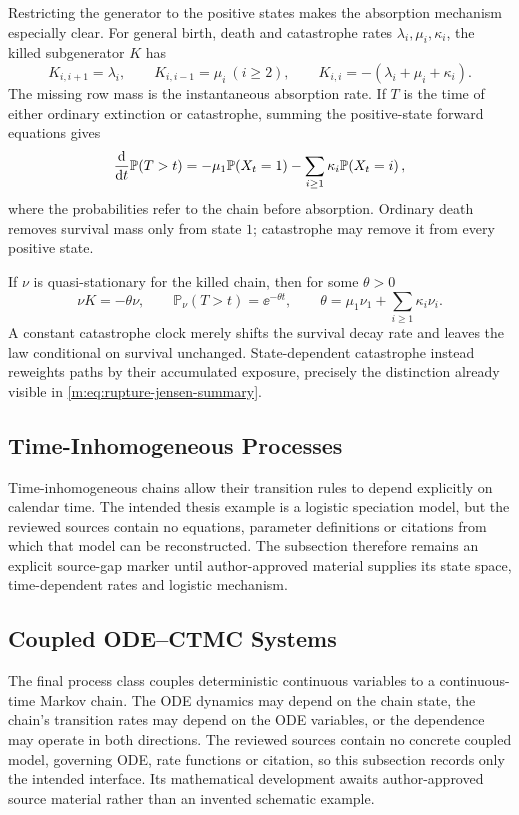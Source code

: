 Restricting the generator to the positive states makes the absorption mechanism
especially clear.  For general birth, death and catastrophe rates
$\lambda_i,\mu_i,\kappa_i$, the killed subgenerator $K$ has
\begin{equation}
  K_{i,i+1}=\lambda_i,\qquad
  K_{i,i-1}=\mu_i\ (i\geq2),\qquad
  K_{i,i}=-(\lambda_i+\mu_i+\kappa_i).
  \label{m:eq:bdc-subgenerator}
\end{equation}
The missing row mass is the instantaneous absorption rate.  If $T$ is the time
of either ordinary extinction or catastrophe, summing the positive-state forward
equations gives
\begin{equation}
  \frac{\mathrm{d}}{\mathrm{d} t}\mathbb{P}\!\left(T>t\right)
  =-\mu_1\mathbb{P}\!\left(X_t=1\right)-\sum_{i\geq1}\kappa_i\mathbb{P}\!\left(X_t=i\right),
  \label{m:eq:bdc-survival-loss}
\end{equation}
where the probabilities refer to the chain before absorption.  Ordinary death
removes survival mass only from state $1$; catastrophe may remove it from every
positive state.

If $\nu$ is quasi-stationary for the killed chain, then for some $\theta>0$
\begin{equation}
  \nu K=-\theta\nu,
  \qquad
  \mathbb P_{\nu}(T>t)=\ee^{-\theta t},
  \qquad
  \theta=\mu_1\nu_1+\sum_{i\geq1}\kappa_i\nu_i.
  \label{m:eq:bdc-qsd-eigenrelation}
\end{equation}
A constant catastrophe clock merely shifts the survival decay rate and leaves the
law conditional on survival unchanged.  State-dependent catastrophe instead
reweights paths by their accumulated exposure, precisely the distinction already
visible in \cref{m:eq:rupture-jensen-summary}.

\subsection{Time-Inhomogeneous Processes}\label{m:sec:time-inhomogeneous}

Time-inhomogeneous chains allow their transition rules to depend explicitly on
calendar time.  The intended thesis example is a logistic speciation model, but the
reviewed sources contain no equations, parameter definitions or citations from
which that model can be reconstructed.  The subsection therefore remains an
explicit source-gap marker until author-approved material supplies its state space,
time-dependent rates and logistic mechanism.

\subsection{Coupled ODE--CTMC Systems}\label{m:sec:coupled-ode-ctmc}

The final process class couples deterministic continuous variables to a
continuous-time Markov chain.  The ODE dynamics may depend on the chain state, the
chain's transition rates may depend on the ODE variables, or the dependence may
operate in both directions.  The reviewed sources contain no concrete coupled
model, governing ODE, rate functions or citation, so this subsection records only
the intended interface.  Its mathematical development awaits author-approved
source material rather than an invented schematic example.
